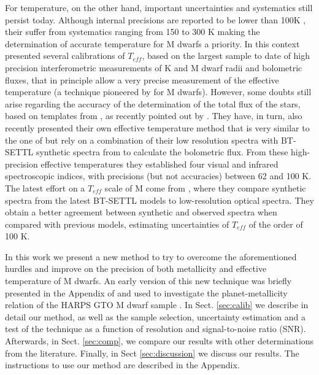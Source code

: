 \documentclass{aa}
\begin{document}
For temperature, on the other hand, important uncertainties and systematics still persist today. Although internal precisions are reported to be lower than 100K \citep[e.g.][]{Casagrande-2008,Rojas-Ayala-2012,Boyajian-2012}, their suffer from systematics ranging from 150 to 300 K making the determination of accurate temperature for M dwarfs a priority. In this context \citet{Boyajian-2012} presented several calibrations of $T_{eff}$, based on the largest sample to date of high precision interferometric measurements of K and M dwarf radii and bolometric fluxes, that in principle allow a very precise measurement of the effective temperature (a technique pioneered by \citet{Segransan-2003} for M dwarfs). However, some doubts still arise regarding the accuracy of the determination of the total flux of the stars, based on templates from \citet{Pickles-1998}, as recently pointed out by \citet[][]{Mann-2013b}. They have, in turn, also recently presented their own effective temperature method that is very similar to the one of \citet{Boyajian-2012} but rely on a combination of their low resolution spectra with BT-SETTL synthetic spectra from \citet{Allard-2011} to calculate the bolometric flux. From these high-precision effective temperatures they established four visual and infrared spectroscopic indices, with precisions (but not accuracies) between 62 and 100 K. The latest effort on a $T_{eff}$ scale of M come from \citet{Rajpurohit-2013a}, where they compare synthetic spectra from the latest BT-SETTL models \citep{Allard-2012} to low-resolution optical spectra. They obtain a better agreement between synthetic and observed spectra when compared with previous models, estimating uncertainties of $T_{eff}$ of the order of 100 K. 





In this work we present a new method to try to overcome the aforementioned hurdles and improve on the precision of both metallicity and effective temperature of M dwarfs. An early version of this new technique was briefly presented in the Appendix of \citet{Neves-2013} and used to investigate the planet-metallicity relation of the HARPS GTO M dwarf sample \citep{Bonfils-2013}. In Sect. \ref{sec:calib} we describe in detail our method, as well as the sample selection, uncertainty estimation and a test of the technique as a function of resolution and signal-to-noise ratio (SNR). Afterwards, in Sect. \ref{sec:comp}, we compare our results with other determinations from the literature. Finally, in Sect \ref{sec:discussion} we discuss our results. The instructions to use our method are described in the Appendix. 
\end{document}

